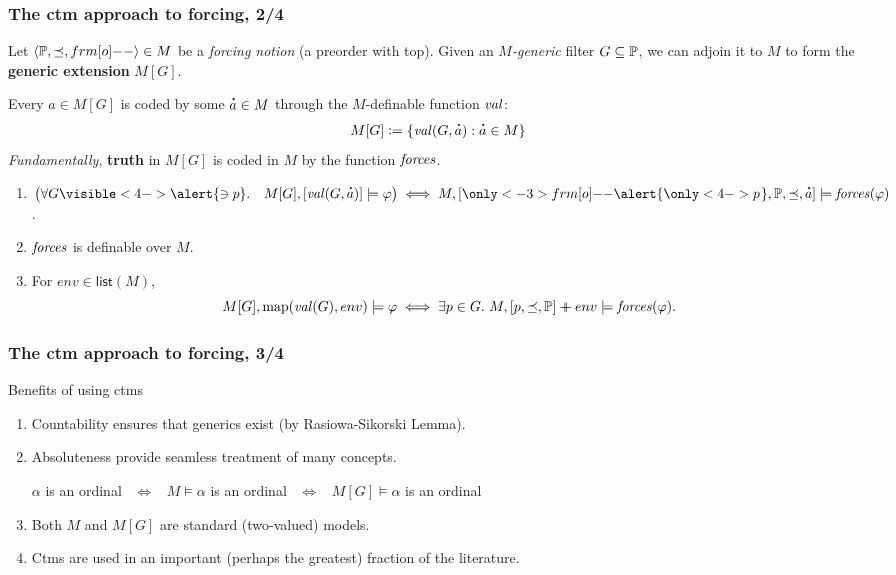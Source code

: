 \documentclass[english]{beamer}
\begin{document}
\begin{frame}
  \frametitle{The ctm approach to forcing, 2/4}
  Let $\lb \PP, {\preceq} ,\1\rb \in M$ be a \emph{forcing notion} (a preorder with top). Given 
  an \emph{$M$-generic} filter $G\subseteq \mathbb{P}$, 
  we can adjoin it to $M$ to form the
  \textbf{generic extension} $M[G]$.
  \pause

  Every $a\in M[G]$ is coded by
  some $\punto{a}\in M$ through the $M$-definable function $\operatorname{\mathit{val}}$:
  \[
  M[G]\defi \{ \val(G,\punto{a}) : \punto{a}\in M\}
  \]
  \emph{Fundamentally}, \textbf{truth} in $M[G]$ is coded in $M$ by the
  function $\mathit{forces}$.
  \pause
  \begin{theorem}
    \begin{enumerate}
    \item $\bigl(\forall G\visible<4->{\alert{\ni p}}.\quad M[G], [\val(G,\punto{a})]
      \models \phi\bigr)
      \iff
      M,
      [\only<-3>{\1}\alert{\only<4->{p\hspace{0.2ex}}},\PP,\preceq,\punto{a}]\models
      \forceisa(\phi)$.
    \item $\mathit{forces}$ is definable over $M$.
      \pause%
      \pause%
    \item For $env\in\mathsf{list}(M)$,
      \[
      M[G], \mathrm{map}(\operatorname{\mathit{val}}(G),env) \models \varphi
      \iff
      \exists p\in G.\ M, [p,\preceq,\mathbb{P}] \mathbin{{+}\!\!\!\!{+}} env \models
      \mathit{forces}(\varphi).
      \]
    \end{enumerate}
  \end{theorem} 
\end{frame}

\begin{frame}
  \frametitle{The ctm approach to forcing, 3/4}
  \begin{block}{Benefits of using ctms}
    \begin{enumerate}
    \item<+-> Countability ensures that generics exist (by
      Rasiowa-Sikorski Lemma).
    \item<+-> Absoluteness provide seamless
      treatment of many concepts.
      \begin{center}
        $\alpha$ is an ordinal \ $\iff$ \  $M\models \alpha$ is
        an ordinal \  $\iff$ \  $M[G]\models \alpha$ is an ordinal
      \end{center}
    \item<+-> Both $M$ and $M[G]$ are standard (two-valued) models.
    \item<+-> Ctms are
      used in an important (perhaps the greatest) fraction of the literature.
    \end{enumerate}
  \end{block}
\end{frame}
\end{document}
